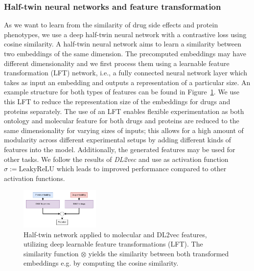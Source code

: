 \documentclass{bioinfo}
\renewcommand{\cite}{\citep}
\begin{document}
\subsubsection{Half-twin neural networks and feature transformation}

As we want to learn from the similarity of drug side effects and
protein phenotypes, we use a deep half-twin neural network with a
contrastive loss using cosine similarity.  A half-twin neural network
aims to learn a similarity between two embeddings of the same
dimension.  The precomputed embeddings may have different
dimensionality and we first process them using a learnable feature
transformation (LFT) network, i.e., a fully connected neural network
layer which takes as input an embedding and outputs a representation
of a particular size. An example structure for both types of features
can be found in Figure~\ref{fig:HalfTwinNetwork}. We use this LFT to
reduce the representation size of the embeddings for drugs and
proteins separately.
The use of an LFT enables flexible experimentation as both ontology
and molecular feature for both drugs and proteins are reduced to
the same dimensionality for varying sizes of inputs; this allows for a
high amount of modularity across different experimental setups by
adding different kinds of features into the model. Additionally, the
generated features may be used for other tasks. %
We follow the results of \textit{DL2vec} \cite{} and use as
activation function $\sigma := \mathrm{LeakyReLU}$ which leads to
improved performance compared to other activation functions.

\begin{figure}[!tpb]%
	\centerline{\includegraphics[width=0.35\textwidth]{figures/siamese_network.png}}
	\caption{Half-twin network applied to molecular and DL2vec
          features, utilizing deep learnable feature transformations
          (LFT). The similarity function $\otimes$ yields the
          similarity between both transformed embeddings e.g. by
          computing the cosine similarity.}
	\label{fig:HalfTwinNetwork}
\end{figure}
\end{document}
